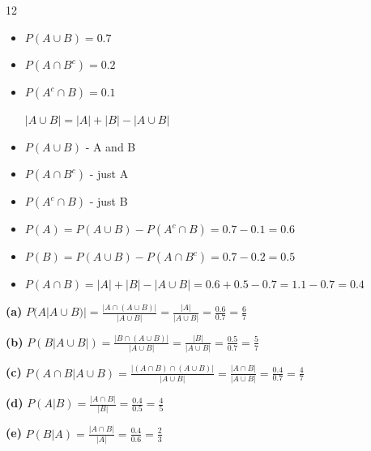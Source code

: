 \documentclass[12 pt]{article}
\begin{document}
    \begin{exercise}{12}
    \hfill

    \begin{itemize}
        \item $P(A \cup B) = 0.7$
        \item $P(A \cap B^c) = 0.2$
        \item $P(A^c \cap B) = 0.1$

        $|A \cup B| = |A| + |B| - |A \cup B|$

        \item $P(A \cup B)$ - A and B
        \item $P(A \cap B^c)$ - just A
        \item $P(A^c \cap B)$ - just B

        \item $P(A) = P(A \cup B) - P(A^c \cap B) = 0.7 - 0.1 = 0.6$
        \item $P(B) = P(A \cup B) - P(A \cap B^c) = 0.7 - 0.2 = 0.5$
        \item $P(A \cap B) = |A| + |B| - |A \cup B| = 0.6 + 0.5 - 0.7 = 1.1-0.7 = 0.4$
    \end{itemize}

    \textbf{(a)} $P(A | A \cup B)| = \frac{|A \cap (A \cup B)|}{|A \cup B|} = \frac{|A|}{|A \cup B|} = \frac{0.6}{0.7} = \frac{6}{7}$

    \textbf{(b)} $P(B | A \cup B|) = \frac{|B \cap (A \cup B)|}{|A \cup B|} = \frac{|B|}{|A \cup B|} = \frac{0.5}{0.7} = \frac{5}{7}$

    \textbf{(c)} $P(A \cap B| A \cup B) = \frac{|(A \cap B) \cap (A \cup B)|}{|A \cup B|} = \frac{|A \cap B|}{|A \cup B|} = \frac{0.4}{0.7} = \frac{4}{7}$

    \textbf{(d)} $P(A | B) = \frac{|A \cap B|}{|B|} = \frac{0.4}{0.5} = \frac{4}{5}$

    \textbf{(e)} $P(B | A) = \frac{|A \cap B|}{|A|} = \frac{0.4}{0.6} = \frac{2}{3}$
    \end{exercise}
\end{document}
